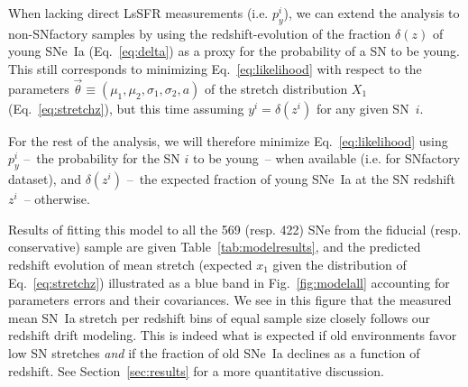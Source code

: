 \documentclass[]{aa}
\begin{document}
When lacking direct LsSFR measurements (i.e. $p_y^i$), we can extend the
analysis to non-SNfactory samples by using the redshift-evolution of the
fraction $\delta(z)$ of young SNe~Ia (Eq.~\ref{eq:delta}) as a proxy for the
probability of a SN to be young. This still corresponds to minimizing
Eq.~\ref{eq:likelihood} with respect to the parameters
$\vec{\theta}\equiv(\mu_1, \mu_2, \sigma_1, \sigma_2, a)$ of the stretch
distribution $X_1$ (Eq.~\ref{eq:stretchz}), but this time assuming $y^i =
\delta(z^i)$ for any given SN~$i$. 

For the rest of the analysis, we will therefore minimize Eq.~\ref{eq:likelihood}
using $p_y^i$ --~the probability for the SN $i$ to be young~-- when available
(i.e. for SNfactory dataset), and $\delta(z^i)$ --~the expected fraction of
young SNe~Ia at the SN redshift $z^i$~-- otherwise.

Results of fitting this model to all the 569 (resp. 422) SNe from the fiducial
(resp. conservative) sample are given Table~\ref{tab:modelresults}, and the
predicted redshift evolution of mean stretch (expected $x_1$ given the
distribution of Eq.~\ref{eq:stretchz}) illustrated as a blue band in
Fig.~\ref{fig:modelall} accounting for parameters errors and their covariances.
We see in this figure that the measured mean SN~Ia stretch per redshift bins of
equal sample size closely follows our redshift drift modeling. This is indeed
what is expected if old environments favor low SN stretches
\citep[e.g.][]{howell2007} \textit{and} if the fraction of old SNe~Ia declines as
a function of redshift. See Section~\ref{sec:results} for a more quantitative
discussion.
\end{document}
